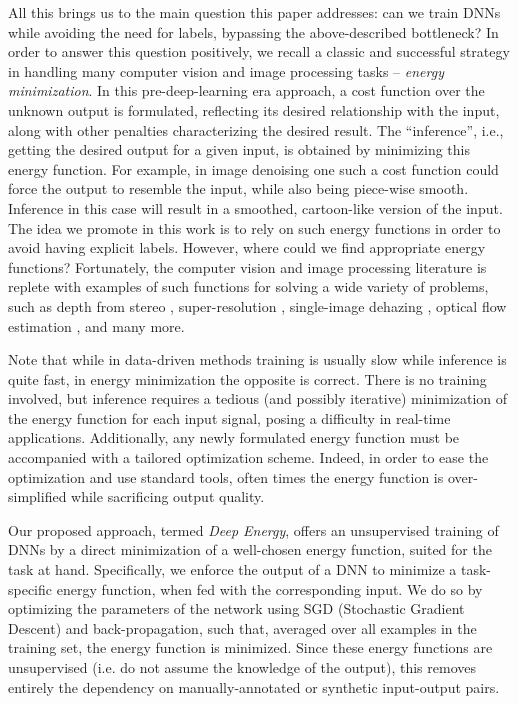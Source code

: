 \documentclass[journal]{IEEEtran}
\begin{document}
All this brings us to the main question this paper addresses: can we train DNNs while avoiding the need for labels, bypassing the above-described bottleneck? In order to answer this question positively, we recall a classic and successful strategy in handling many computer vision and image processing tasks -- \emph{energy minimization}. In this pre-deep-learning era approach, a cost function over the unknown output is formulated, reflecting its desired relationship with the input, along with other penalties characterizing the desired result.  The ``inference'', i.e., getting the desired output for a given input, is obtained by minimizing this energy function. For example, in image denoising one such a cost function could force the output to resemble the input, while also being piece-wise smooth. Inference in this case will result in a smoothed, cartoon-like version of the input. The idea we promote in this work is to rely on such energy functions in order to avoid having explicit labels. However, where could we find appropriate energy functions? Fortunately, the computer vision and image processing literature is replete with examples of such functions for solving a wide variety of problems, such as depth from stereo \cite{energy_stereo}, super-resolution \cite{energy_sr}, single-image dehazing \cite{energy_dehazing}, optical flow estimation \cite{energy_optic}, and many more. 

Note that while in data-driven methods training is usually slow while inference is quite fast, in energy minimization the opposite is correct. There is no training involved, but inference requires a tedious (and possibly iterative) minimization of the energy function for each input signal, posing a difficulty in real-time applications. Additionally, any newly formulated energy function must be accompanied with a tailored optimization scheme. Indeed, in order to ease the optimization and use standard tools, often times the energy function is over-simplified while sacrificing output quality. 

Our proposed approach, termed \emph{Deep Energy}, offers an unsupervised training of DNNs by a direct minimization of a well-chosen energy function, suited for the task at hand. Specifically, we enforce the output of a DNN to minimize a task-specific energy function, when fed with the corresponding input. We do so by optimizing the parameters of the network using SGD (Stochastic Gradient Descent) and back-propagation, such that, averaged over all examples in the training set, the energy function is minimized. Since these energy functions are unsupervised (i.e. do not assume the knowledge of the output), this removes entirely the dependency on manually-annotated or synthetic input-output pairs.
\end{document}
